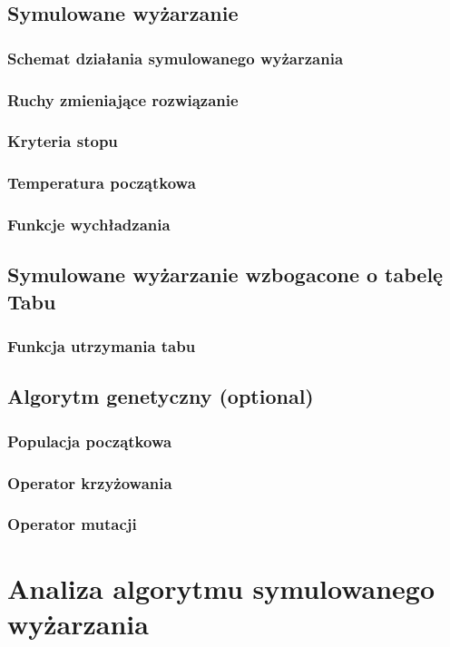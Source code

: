\section{Symulowane wyżarzanie}
\subsection{Schemat działania symulowanego wyżarzania}
\subsection{Ruchy zmieniające rozwiązanie}
\subsection{Kryteria stopu}
\subsection{Temperatura początkowa}
\subsection{Funkcje wychładzania}
\section{Symulowane wyżarzanie wzbogacone o tabelę Tabu}
\subsection{Funkcja utrzymania tabu}
\section{Algorytm genetyczny (optional)}
\subsection{Populacja początkowa}
\subsection{Operator krzyżowania}
\subsection{Operator mutacji}


\chapter{Analiza algorytmu symulowanego wyżarzania}
